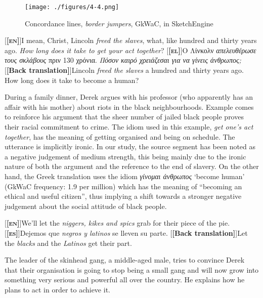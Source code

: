 \documentclass[output=paper]{LSP/langsci}
\begin{document}
\begin{figure}
\texttt{[image: ./figures/4-4.png]}
\caption{Concordance lines, \textit{border jumpers}, GkWaC, in SketchEngine} \label{fig:2:5}
\end{figure}

\ea \label{ex:2:22}
\begin{xlist}
\exi{}[\textbf{[\textsc{en}]}]{I mean, Christ, Lincoln \emph{freed the slaves}, what, like hundred and thirty years ago. \emph{How long does it take to get your act together}?}
\exi{}[\textbf{[\textsc{el}]}]{Ο Λίνκολν \emph{απελευθέρωσε τους σκλάβους} πριν 130 χρόνια. \emph{Πόσον καιρό χρειάζεσαι για να γίνεις άνθρωπος;}}
\exi{}[\textbf{[Back translation]}]{Lincoln \emph{freed the slaves} a hundred and thirty years ago. How long does it take to become a human?}
\end{xlist}
\z

During a family dinner, Derek argues with his professor (who apparently has an affair with his mother) about riots in the black neighbourhoods. Example  comes to reinforce his argument that the sheer number of jailed black people proves their racial commitment to crime. The idiom used in this example, \textit{get one's act together}, has the meaning of getting organised and being on schedule. The utterance is implicitly ironic. In our study, the source segment has been noted as a negative judgement of medium strength, this being mainly due to the ironic nature of both the argument and the reference to the end of slavery. On the other hand, the Greek translation uses the idiom \textit{γίνομαι άνθρωπος} `become human' (GkWaC frequency: 1.9 per million) which has the meaning of “becoming an ethical and useful citizen”, thus implying a shift towards a stronger negative judgement about the social attitude of black people.\newline

\ea \label{ex:2:23}
\begin{xlist}
\exi{}[\textbf{[\textsc{en}]}]{We'll let the \emph{niggers, kikes and spics} grab for their piece of the pie.}
\exi{}[\textbf{[\textsc{es}]}]{Dejemos que \emph{negros y latinos} se lleven su parte.}
\exi{}[\textbf{[Back translation]}]{Let the \emph{blacks} and the \emph{Latinos} get their part.}
\end{xlist}
\z

The leader of the skinhead gang, a middle-aged male, tries to convince Derek that their organisation is going to stop being a small gang and will now grow into something very serious and powerful all over the country. He explains how he plans to act in order to achieve it.
\end{document}
